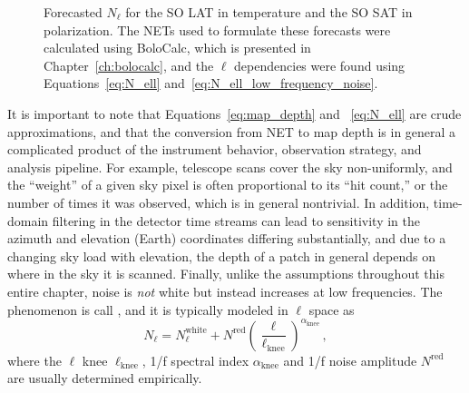 \begin{figure}[!t]
    \centering
    \caption{Forecasted $N_{\ell}$  for the SO LAT in temperature and the SO SAT in polarization. The NETs used to formulate these forecasts were calculated using BoloCalc, which is presented in Chapter~\ref{ch:bolocalc}, and the $\ell$ dependencies were found using Equations~\ref{eq:N_ell} and~\ref{eq:N_ell_low_frequency_noise}.}
    \label{fig:N_ell_noise_curves}
\end{figure}

It is important to note that Equations~\ref{eq:map_depth} and ~\ref{eq:N_ell} are crude approximations, and that the conversion from NET to map depth is in general a complicated product of the instrument behavior, observation strategy, and analysis pipeline. For example, telescope scans cover the sky non-uniformly, and the ``weight'' of a given sky pixel is often proportional to its ``hit count,'' or the number of times it was observed, which is in general nontrivial. In addition, time-domain filtering in the detector time streams can lead to sensitivity in the azimuth and elevation (Earth) coordinates differing substantially, and due to a changing sky load with elevation, the depth of a patch in general depends on where in the sky it is scanned. Finally, unlike the assumptions throughout this entire chapter, noise is \textit{not} white but instead increases at low frequencies. The phenomenon is call , and it is typically modeled in $\ell$ space as
\begin{equation}
    N_{\ell} = N_{\ell}^{\mathrm{white}} + N^{\mathrm{red}} \left( \frac{\ell}{\ell_{\mathrm{knee}}} \right)^{\alpha_{\mathrm{knee}}} \, ,
    \label{eq:N_ell_low_frequency_noise}
\end{equation}
where the $\ell$ knee $\ell_{\mathrm{knee}}$, 1/f spectral index
$\alpha_{\mathrm{knee}}$ and 1/f noise amplitude $N^{\mathrm{red}}$ are usually determined empirically.

